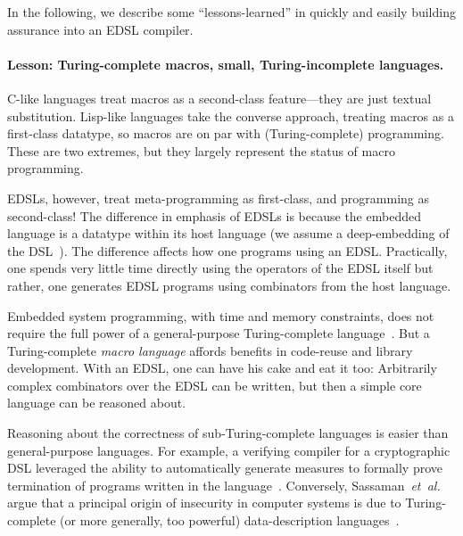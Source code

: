 \documentclass[9pt]{sigplanconf}
\begin{document}
In the following, we describe some ``lessons-learned'' in quickly and easily
building assurance into an EDSL compiler.






\paragraph{Lesson: Turing-complete macros, small, Turing-incomplete languages.}
\label{sec:turing}
C-like languages treat macros as a second-class feature---they are just textual
substitution.  Lisp-like languages take the converse approach, treating macros
as a first-class datatype, so macros are on par with (Turing-complete)
programming.  These are two extremes, but they largely represent the status
of macro programming.

EDSLs, however, treat meta-programming as first-class, and programming as
second-class!  The difference in emphasis of EDSLs is because the embedded
language is a datatype within its host language (we assume a deep-embedding of
the DSL~\cite{gill}).  The difference affects how one programs using an EDSL.
Practically, one spends very little time directly using the operators of the
EDSL itself but rather, one generates EDSL programs using combinators from the
host language.

Embedded system programming, with time and memory constraints, does not require
the full power of a general-purpose Turing-complete language~\cite{CaspiPHP87}.
But a Turing-complete \emph{macro language} affords benefits in code-reuse and
library development.  With an EDSL, one can have his cake and eat it too:
Arbitrarily complex combinators over the EDSL can be written, but then a simple
core language can be reasoned about.

Reasoning about the correctness of sub-Turing-complete languages is easier than
general-purpose languages.  For example, a verifying compiler for a
cryptographic DSL leveraged the ability to automatically generate measures to
formally prove termination of programs written in the language~\cite{mcrypt}.
Conversely, Sassaman~\emph{et~al.} argue that a principal origin of insecurity
in computer systems is due to Turing-complete (or more generally, too powerful)
data-description languages~\cite{turing}.
\end{document}
